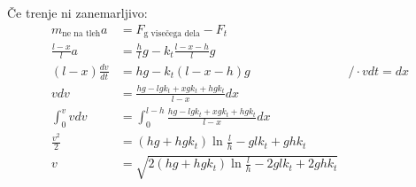 \documentclass[a4,11pt]{article}
\begin{document}
    Če trenje ni zanemarljivo:
    \begin{align*}
        m_{\text{ne na tleh}} a &= F_{\text{g visečega dela}} - F_t & \\
        \frac{l - x}{l} a &= \frac{h}{l} g - k_t \frac{l - x - h}{l} g & \\
        \left(l - x\right)\frac{dv}{dt} &= h g - k_t \left(l - x - h\right) g & \big/ \cdot v dt = dx \\
        v dv &= \frac{h g - l g k_t + x g k_t + h g k_t}{l - x} dx & \\
        \int_0^v v dv &= \int_0^{l - h} \frac{h g - l g k_t + x g k_t + h g k_t}{l - x} dx & \\
        \frac{v^2}{2} &= \left(hg + hgk_t\right)\ln\frac{l}{h} - glk_t + ghk_t & \\
        v &= \sqrt{2\left(hg + hgk_t\right)\ln\frac{l}{h} - 2glk_t + 2ghk_t} &
    \end{align*}
\end{document}
